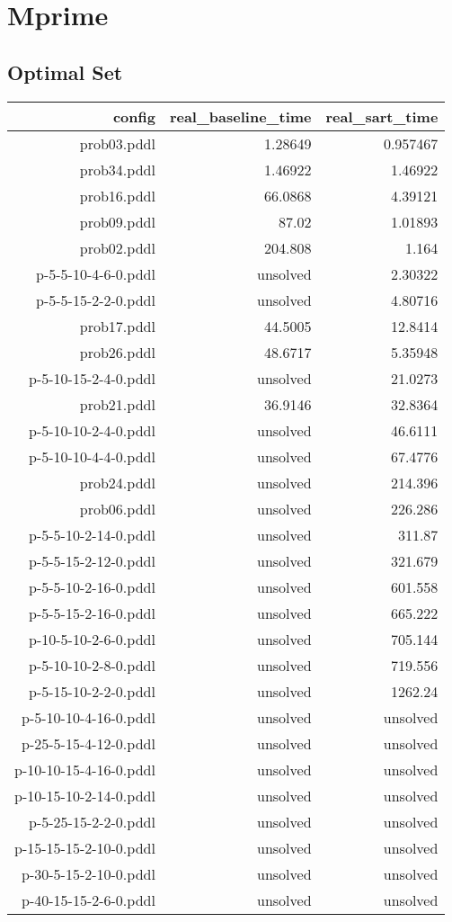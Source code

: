 \documentclass{article}
\begin{document}
                \newpage \section{Mprime}
                    \subsection*{Optimal Set}
                    
                            \begin{center}
                            \scriptsize
                            \begin{tabular}{r|r|r}
                            config & real\_baseline\_time & real\_sart\_time\\\midrule
                             prob03.pddl&1.28649&0.957467\\
 prob34.pddl&1.46922&1.46922\\
 prob16.pddl&66.0868&4.39121\\
 prob09.pddl&87.02&1.01893\\
 prob02.pddl&204.808&1.164\\
 p-5-5-10-4-6-0.pddl&unsolved&2.30322\\
 p-5-5-15-2-2-0.pddl&unsolved&4.80716\\
 prob17.pddl&44.5005&12.8414\\
 prob26.pddl&48.6717&5.35948\\
 p-5-10-15-2-4-0.pddl&unsolved&21.0273\\
 prob21.pddl&36.9146&32.8364\\
 p-5-10-10-2-4-0.pddl&unsolved&46.6111\\
 p-5-10-10-4-4-0.pddl&unsolved&67.4776\\
 prob24.pddl&unsolved&214.396\\
 prob06.pddl&unsolved&226.286\\
 p-5-5-10-2-14-0.pddl&unsolved&311.87\\
 p-5-5-15-2-12-0.pddl&unsolved&321.679\\
 p-5-5-10-2-16-0.pddl&unsolved&601.558\\
 p-5-5-15-2-16-0.pddl&unsolved&665.222\\
 p-10-5-10-2-6-0.pddl&unsolved&705.144\\
 p-5-10-10-2-8-0.pddl&unsolved&719.556\\
 p-5-15-10-2-2-0.pddl&unsolved&1262.24\\
 p-5-10-10-4-16-0.pddl&unsolved&unsolved\\
 p-25-5-15-4-12-0.pddl&unsolved&unsolved\\
 p-10-10-15-4-16-0.pddl&unsolved&unsolved\\
 p-10-15-10-2-14-0.pddl&unsolved&unsolved\\
 p-5-25-15-2-2-0.pddl&unsolved&unsolved\\
 p-15-15-15-2-10-0.pddl&unsolved&unsolved\\
 p-30-5-15-2-10-0.pddl&unsolved&unsolved\\
 p-40-15-15-2-6-0.pddl&unsolved&unsolved
                            \end{tabular}
                            \end{center}
                    
\end{document}
